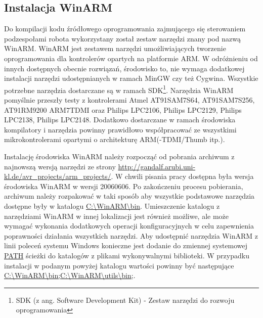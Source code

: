 \subsection{Instalacja WinARM}
Do kompilacji kodu źródłowego oprogramowania zajmującego się sterowaniem
podzespołami robota wykorzystany został zestaw narzędzi znany pod nazwą WinARM.
WinARM jest zestawem narzędzi umożliwiających tworzenie oprogramowania dla
kontrolerów opartych na platformie ARM. W odróżnieniu od innych dostępnych
obecnie rozwiązań, środowisko to, nie wymaga dodatkowej instalacji narzędzi
udostępnianych w ramach MinGW czy też Cygwina. Wszystkie potrzebne narzędzia
dostarczane są w ramach SDK\footnote{SDK (z ang. Software Development Kit) -
Zestaw narzędzi do rozwoju oprogramowania}. Narzędzia WinARM pomyślnie przeszły
testy z kontrolerami Atmel AT91SAM7S64, AT91SAM7S256, AT91RM9200 ARM7TDMI oraz
Philips LPC2106, Philips LPC2129, Philips LPC2138, Philips LPC2148. Dodatkowo
dostarczane w ramach środowiska kompilatory i narzędzia powinny prawidłowo
współpracować ze wszystkimi mikrokontrolerami opartymi o architekturę
ARM(-TDMI/Thumb itp.).

Instalację środowiska WinARM należy rozpocząć od pobrania archiwum z najnowszą
wersją narzędzi ze strony
\url{http://gandalf.arubi.uni-kl.de/avr_projects/arm_projects/}. W chwili pisania
pracy dostępna była wersja środowiska WinARM w wersji 20060606. Po zakończeniu
procesu pobierania, archiwum należy rozpakować w taki sposób aby wszystkie
podstawowe narzędzia dostępne były w katalogu \url{C:\WinARM\bin}. Umieszczenie
katalogu z narzędziami WinARM w innej lokalizacji jest również możliwe, ale może
wymagać wykonania dodatkowych operacji konfiguracyjnych w celu zapewnienia
poprawności działania wszystkich narzędzi. Aby udostępnić narzędzia WinARM z
linii poleceń systemu Windows konieczne jest dodanie do zmiennej systemowej
\url{PATH} ścieżki do katalogów z plikami wykonywalnymi biblioteki. W przypadku
instalacji w podanym powyżej katalogu wartości powinny być następujące
\url{C:\WinARM\bin;C:\WinARM\utils\bin;}.

